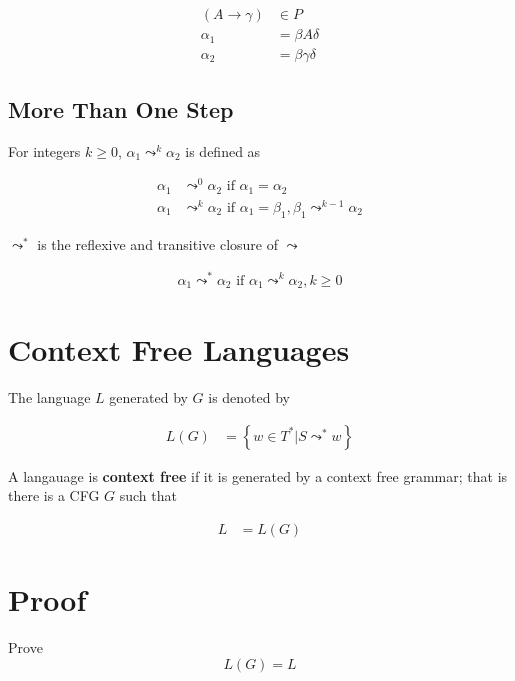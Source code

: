   \begin{align}
    \left( A \to \gamma \right) &\in P \\
    \alpha_{1} &= \beta A \delta \\
    \alpha_{2} &= \beta \gamma \delta
  \end{align}

  \subsection{More Than One Step}

    For integers $ k \ge 0 $, $ \alpha_{1} \leadsto^{k} \alpha_{2} $ is
    defined as

    \begin{align}
      \alpha_{1} &\leadsto^{0} \alpha_{2} \text{ if } \alpha_{1} = \alpha_{2} \\
      \alpha_{1} &\leadsto^{k} \alpha_{2} \text{ if } \alpha_{1} = \beta_{1}, \beta_{1} \leadsto^{k - 1} \alpha_{2}
    \end{align}

    $ \leadsto^{*} $ is the reflexive and transitive closure of $ \leadsto $

    \begin{align*}
      \alpha_{1} \leadsto^{*} \alpha_{2} \text{ if } \alpha_{1} \leadsto^{k} \alpha_{2}, k \ge 0
    \end{align*}

\section{Context Free Languages}

  The language $ L $ generated by $ G $ is denoted by

  \begin{align}
    L\left( G \right) &= \left\{ w \in T^{*} | S \leadsto^{*} w \right\}
  \end{align}

  A langauage is \textbf{context free} if it is generated by
  a context free grammar; that is there is a CFG $ G $ such that

  \begin{align}
    L &= L\left( G \right)
  \end{align}

\section{Proof}

  Prove
  \begin{equation*}
    L\left( G \right) = L
  \end{equation*}

